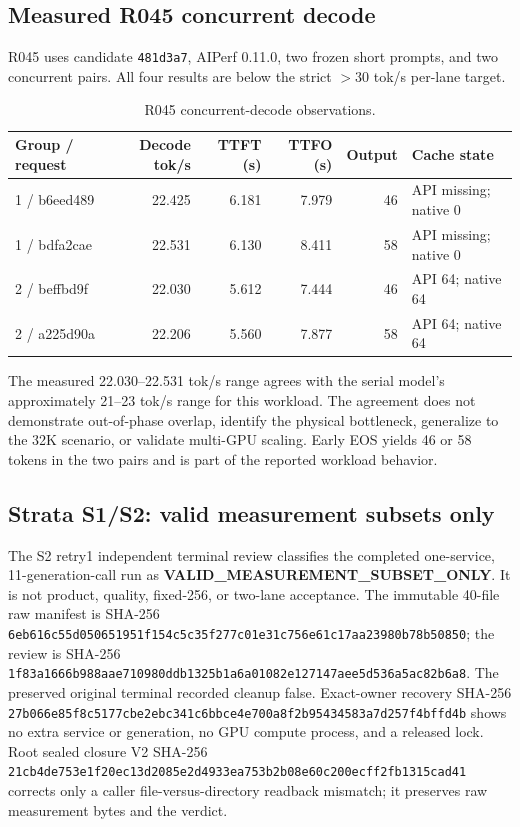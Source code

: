 \documentclass[11pt]{article}
\begin{document}
\subsection{Measured R045 concurrent decode}

R045 uses candidate \texttt{481d3a7}, AIPerf 0.11.0, two frozen short prompts, and two concurrent pairs. All four results are below the strict $>30$ tok/s per-lane target.

\begin{table}[t]
\centering
\scriptsize
\begin{tabular}{lrrrrl}
\toprule
Group / request & Decode tok/s & TTFT (s) & TTFO (s) & Output & Cache state \\
\midrule
1 / b6eed489 & 22.425 & 6.181 & 7.979 & 46 & API missing; native 0 \\
1 / bdfa2cae & 22.531 & 6.130 & 8.411 & 58 & API missing; native 0 \\
2 / beffbd9f & 22.030 & 5.612 & 7.444 & 46 & API 64; native 64 \\
2 / a225d90a & 22.206 & 5.560 & 7.877 & 58 & API 64; native 64 \\
\bottomrule
\end{tabular}
\caption{R045 concurrent-decode observations.}
\label{tab:r045}
\end{table}

The measured 22.030--22.531 tok/s range agrees with the serial model's approximately 21--23 tok/s range for this workload. The agreement does not demonstrate out-of-phase overlap, identify the physical bottleneck, generalize to the 32K scenario, or validate multi-GPU scaling. Early EOS yields 46 or 58 tokens in the two pairs and is part of the reported workload behavior.

\subsection{Strata S1/S2: valid measurement subsets only}
\label{sec:strata}

The S2 retry1 independent terminal review classifies the completed one-service, 11-generation-call run as \textbf{VALID\_MEASUREMENT\_SUBSET\_ONLY}. It is not product, quality, fixed-256, or two-lane acceptance. The immutable 40-file raw manifest is SHA-256 \texttt{6eb616c55d050651951f154c5c35f277c01e31c756e61c17aa23980b78b50850}; the review is SHA-256 \texttt{1f83a1666b988aae710980ddb1325b1a6a01082e127147aee5d536a5ac82b6a8}. The preserved original terminal recorded cleanup false. Exact-owner recovery SHA-256 \texttt{27b066e85f8c5177cbe2ebc341c6bbce4e700a8f2b95434583a7d257f4bffd4b} shows no extra service or generation, no GPU compute process, and a released lock. Root sealed closure V2 SHA-256 \texttt{21cb4de753e1f20ec13d2085e2d4933ea753b2b08e60c200ecff2fb1315cad41} corrects only a caller file-versus-directory readback mismatch; it preserves raw measurement bytes and the verdict.
\end{document}
